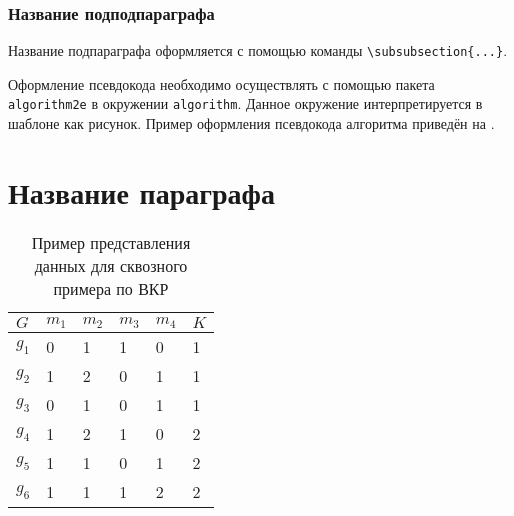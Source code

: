 \subsubsection{Название подподпараграфа} \label{ch2:subsubsec-title-abbr} %
	
	
Название подпараграфа оформляется с помощью команды  \texttt{\textbackslash{}subsubsecti\-on\{...\}}.




	
Оформление псевдокода необходимо осуществлять с помощью пакета \verb|algorithm2e| в окружении \verb|algorithm|. Данное окружение интерпретируется в шаблоне как рисунок. Пример оформления псевдокода алгоритма приведён на . 
	
	

	
	\section{Название параграфа} \label{ch2:sec-very-short-title} %


	


%



\begin{table} [htbp]%
	\centering\small
	\caption{Пример представления данных для сквозного примера по ВКР \cite{Peskov2004}}%
	\label{tab:ToyCompare}		
		\begin{tabular}{|l|l|l|l|l|l|}
			\hline
			$G$&$m_1$&$m_2$&$m_3$&$m_4$&$K$\\
			\hline
			$g_1$&0&1&1&0&1\\ \hline
			$g_2$&1&2&0&1&1\\ \hline
			$g_3$&0&1&0&1&1\\ \hline
			$g_4$&1&2&1&0&2\\ \hline
			$g_5$&1&1&0&1&2\\ \hline
			$g_6$&1&1&1&2&2\\ \hline		
		\end{tabular}
	\normalsize%
\end{table}



